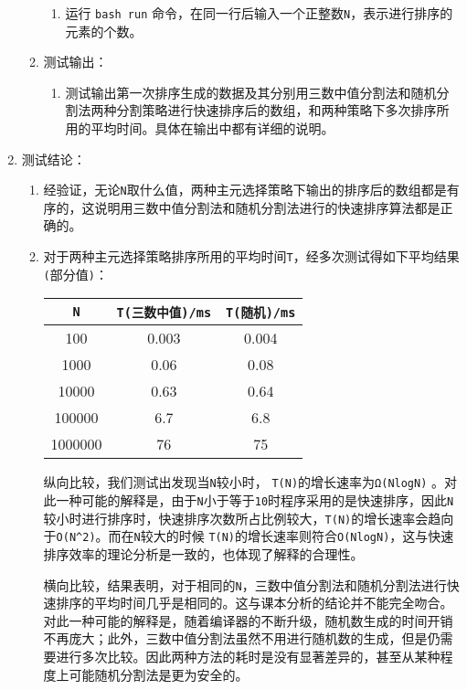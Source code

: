 \documentclass[a4paper,12pt]{article}
\begin{document}
\begin{enumerate}
\begin{enumerate}
\begin{enumerate}
        \item 运行 \verb|bash run| 命令，{\hei 在同一行后输入一个正整数\verb|N|，表示进行排序的元素的个数}。
    \end{enumerate}
    \item 测试输出：
        \begin{enumerate}
        \item 测试输出第一次排序生成的数据及其分别用三数中值分割法和随机分割法两种分割策略进行快速排序后的数组，和两种策略下多次排序所用的平均时间。具体在输出中都有详细的说明。
    \end{enumerate}
\end{enumerate}
\item 测试结论：
\begin{enumerate}
     \item 经验证，无论\verb|N|取什么值，两种主元选择策略下输出的排序后的数组都是有序的，这说明{\hei 用三数中值分割法和随机分割法进行的快速排序算法都是正确的}。
     \item 对于两种主元选择策略排序所用的平均时间\verb|T|，经多次测试得如下平均结果\verb|(|部分值\verb|)|：
     
     \begin{center}
     \begin{tabular}{|c|c|c|}
     \hline
        \verb|N|  & \verb|T(三数中值)/ms| & \verb|T(随机)/ms|\\
     \hline
     100  & 0.003 & 0.004 \\
     \hline
     1000 & 0.06 & 0.08 \\
     \hline
     10000 & 0.63 & 0.64 \\
     \hline
     100000 & 6.7 & 6.8 \\
     \hline
     1000000 & 76 & 75 \\
     \hline
     \end{tabular}
     \end{center}

     纵向比较，我们测试出发现当\verb|N|较小时， 
     \verb|T(N)|的增长速率为\verb|Ω(NlogN)|
     。{\hei 对此一种可能的解释是}，由于\verb|N|小于等于\verb|10|时程序采用的是快速排序，因此\verb|N|较小时进行排序时，快速排序次数所占比例较大，\verb|T(N)|的增长速率会趋向于\verb|O(N^2)|。而在\verb|N|较大的时候 \verb|T(N)|的增长速率则符合\verb|O(NlogN)|，这与快速排序效率的理论分析是一致的，也体现了解释的合理性。
     
     横向比较，结果表明，对于相同的\verb|N|，三数中值分割法和随机分割法进行快速排序的平均时间几乎是相同的。这与课本分析的结论并不能完全吻合。{\hei 对此一种可能的解释是}，随着编译器的不断升级，随机数生成的时间开销不再庞大；此外，三数中值分割法虽然不用进行随机数的生成，但是仍需要进行多次比较。因此两种方法的耗时是没有显著差异的，甚至从某种程度上可能随机分割法是更为安全的。

\end{enumerate}
\end{enumerate}



\end{document}
